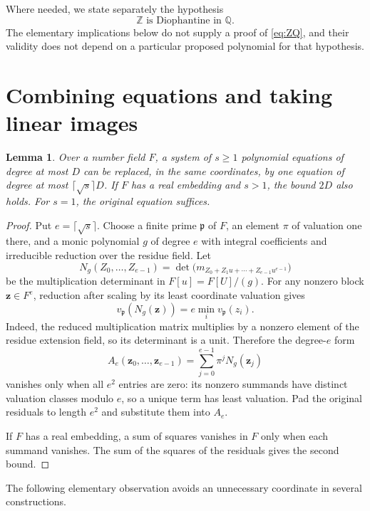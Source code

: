 \documentclass[11pt,a4paper]{article}
\newtheorem{lemma}[theorem]{Lemma}
\theoremstyle{definition}
\newcommand{\Q}{\mathbb Q}
\newcommand{\Z}{\mathbb Z}
\begin{document}
Where needed, we state separately the hypothesis
\begin{equation}\label{eq:ZQ}
                    \Z\text{ is Diophantine in }\Q.
                    \tag{H}
\end{equation}
The elementary implications below do not supply a proof of
\eqref{eq:ZQ}, and their validity does not depend on a particular
proposed polynomial for that hypothesis.

\section{Combining equations and taking linear images}

\begin{lemma}\label{lem:combine}
Over a number field $F$, a system of $s\ge1$ polynomial equations of
degree at most $D$ can be replaced, in the same coordinates, by one
equation of degree at most $\lceil\sqrt{s}\rceil D$.
If $F$ has a real embedding and $s>1$, the bound $2D$ also holds.
For $s=1$, the original equation suffices.
\end{lemma}
\begin{proof}
Put $e=\lceil\sqrt{s}\rceil$. Choose a finite prime $\mathfrak p$
of $F$, an element $\pi$ of valuation one there, and a monic
polynomial $g$ of degree $e$ with integral coefficients and
irreducible reduction over the residue field. Let
\[
 N_g(Z_0,\ldots,Z_{e-1})
  =\det\bigl(m_{Z_0+Z_1u+\cdots+Z_{e-1}u^{e-1}}\bigr)
\]
be the multiplication determinant in $F[u]=F[U]/(g)$.
For any nonzero block $\mathbf z\in F^e$, reduction after scaling
by its least coordinate valuation gives
\[
        v_{\mathfrak p}(N_g(\mathbf z))
                      =e\min_i v_{\mathfrak p}(z_i).
\]
Indeed, the reduced multiplication matrix multiplies by a nonzero
element of the residue extension field, so its determinant is a
unit. Therefore the degree-$e$ form
\[
       A_e(\mathbf z_0,\ldots,\mathbf z_{e-1})
                    =\sum_{j=0}^{e-1}\pi^jN_g(\mathbf z_j)
\]
vanishes only when all $e^2$ entries are zero: its nonzero summands
have distinct valuation classes modulo $e$, so a unique term has
least valuation. Pad the original residuals to length $e^2$ and
substitute them into $A_e$.

If $F$ has a real embedding, a sum of squares vanishes in $F$
only when each summand vanishes. The sum of the squares of the
residuals gives the second bound.
\end{proof}

The following elementary observation avoids an unnecessary
coordinate in several constructions.
\end{document}
